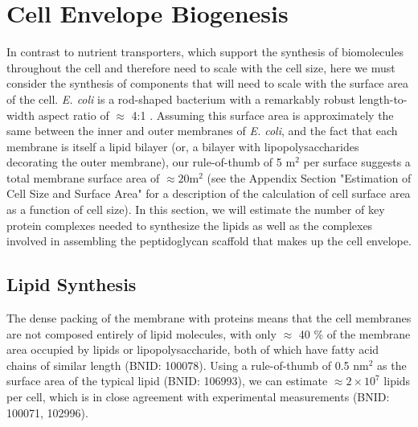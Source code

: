 \section{Cell Envelope Biogenesis}
In contrast to nutrient transporters, which support the synthesis of
biomolecules throughout the cell and therefore need to scale with the cell
size, here we must consider the synthesis of components that will need to
scale with the surface area of the cell. \textit{E. coli} is a rod-shaped
bacterium with a remarkably robust length-to-width aspect ratio of $\approx$
4:1 \citep{harris2018, ojkic2019}. Assuming this surface area is
approximately the same between the inner and outer membranes of \textit{E.
coli}, and the fact that each membrane is itself a lipid bilayer (or, a
bilayer with lipopolysaccharides decorating the outer membrane), our rule-of-thumb
of 5 \textmu m$^2$ per surface suggests a total membrane surface area of
$\approx 20  $\textmu m$^2$ (see the Appendix Section "Estimation of Cell Size and Surface Area" for a description of the calculation of cell
surface area as a function of cell size). In this section, we will estimate
the number of key protein complexes needed to synthesize the lipids as well
as the complexes involved in assembling the peptidoglycan scaffold that makes
up the cell envelope.

\subsection{Lipid Synthesis}
The dense packing of the membrane with proteins means that the cell membranes
are not composed entirely of lipid molecules, with only $\approx$ 40 \% of the
membrane area occupied by lipids or lipopolysaccharide, both of which have fatty
acid chains of similar length (BNID: 100078). Using a rule-of-thumb of 0.5
nm$^2$ as the surface area of the typical lipid (BNID: 106993), we can
estimate $\approx 2 \times 10^7$ lipids per cell, which is in close
agreement with experimental measurements (BNID: 100071, 102996).

